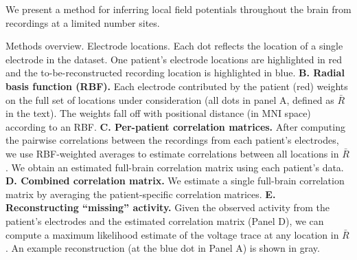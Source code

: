 
We present a method for inferring local field potentials throughout the brain from recordings at a limited number sites.

Methods overview. Electrode
      locations.  Each dot reflects the location of a single
    electrode in the dataset.  One patient's electrode locations are
    highlighted in red and the to-be-reconstructed recording location
    is highlighted in blue. \textbf{B. Radial basis function (RBF).}
    Each electrode contributed by the patient (red) weights on the
    full set of locations under consideration (all dots in panel A,
    defined as $\bar{R}$ in the text).  The weights fall off with
    positional distance (in MNI space) according to an RBF.
    \textbf{C. Per-patient correlation matrices.}  After computing the
    pairwise correlations between the recordings from each patient's
    electrodes, we use RBF-weighted averages to estimate correlations
    between all locations in $\bar{R}$.  We obtain an estimated
    full-brain correlation matrix using each patient's
    data. \textbf{D.  Combined correlation matrix.}  We estimate a
    single full-brain correlation matrix by averaging 
    the patient-specific correlation matrices.  \textbf{E.
      Reconstructing ``missing'' activity.}  Given the observed
    activity from the patient's electrodes and the estimated
    correlation matrix (Panel D), we can compute a maximum likelihood
    estimate of the voltage trace at any location in $\bar{R}$.  An
    example reconstruction (at the blue dot in Panel A) is shown in
    gray.


